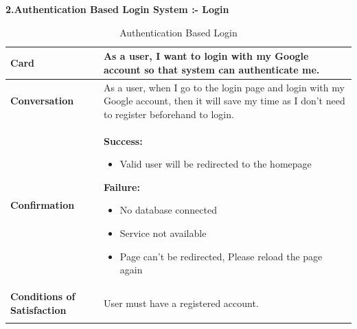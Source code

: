 \textbf{2.Authentication Based Login System :- Login}
\begin{center}
\setlength{\tabcolsep}{0.8cm}
\renewcommand{\arraystretch}{1.2}
        \centering
        \begin{longtable}{|m{70pt}|p{9cm}|}
            \hline
                \textbf{Card} &
                As a user, I want to login with my Google account so that system can authenticate me.\\
            \hline
                \textbf{Conversation} &
                    As a user, when I go to the login page and login with my Google account, then it will save my time as I don't need to register beforehand to login. \\
            \hline
                \textbf{Confirmation} & 
                    \textbf{Success:} 	
                        \begin{itemize}
                        \item Valid user will be redirected to the homepage
                        \end{itemize}

    	            \textbf{Failure:}
                        \begin{itemize}
                        \item No database connected
                        \item Service not available
                        \item Page can't be redirected, Please reload the page again
                        \end{itemize} \\
            \hline
                \textbf{Conditions of Satisfaction} &  
                        User must have a registered account. \\
            \hline
        \caption{Authentication Based Login}
        \label{tab:my_label}
        \end{longtable}
\end{center}

